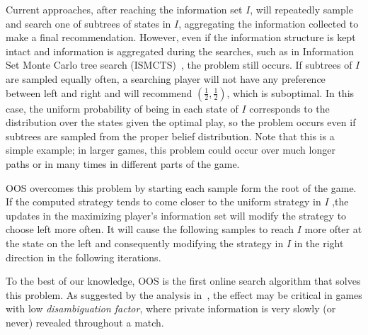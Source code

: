 \documentclass{aamas2015}
\newcommand{\ttm}{\mathtt{m}}
\begin{document}
Current approaches, after reaching the information set $I$, will repeatedly sample and search one of subtrees of states in $I$, aggregating the information collected to make a final recommendation.
However, even if the information structure is kept intact and information is aggregated during the searches, such as in Information Set Monte Carlo tree search (ISMCTS)~\cite{Cowling12ISMCTS}, the problem still occurs. If subtrees of $I$ are sampled equally often, a searching player will not have any preference between left and right and will recommend $(\frac{1}{2},\frac{1}{2})$, which is suboptimal.
In this case, the uniform probability of being in each state of $I$ corresponds to the distribution over the states given the optimal play, so the problem occurs even if subtrees are sampled from the proper belief distribution. 
Note that this is a simple example; in larger games, this problem could occur over much longer paths or in many times in different parts of the game.

OOS overcomes this problem by starting each sample form the root of the game. If the computed strategy tends to come closer to the uniform strategy in $I$ ,the updates in the maximizing player's information set will modify the strategy to choose left more often. It will cause the following samples to reach $I$ more ofter at the state on the left and consequently modifying the strategy in $I$ in the right direction in the following iterations.

To the best of our knowledge, OOS is the first online search algorithm that solves this problem. As suggested by the analysis in~\cite{Long10Understanding}, the effect may be critical in games with low {\it disambiguation factor}, where private information is very slowly (or never) revealed throughout a match.
\end{document}
